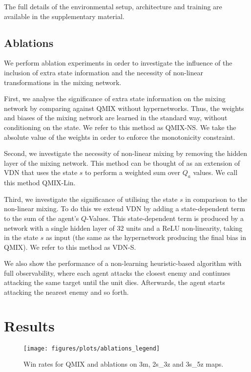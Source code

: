\documentclass{article}
\begin{document}
The full details of the environmental setup, architecture and training are available in the supplementary material.
 





\subsection{Ablations} 
\label{sub:abl}

We perform ablation experiments in order to investigate the influence of the inclusion of extra state information and the necessity of non-linear transformations in the mixing network. 

First, we analyse the significance of extra state information on the mixing network by comparing against QMIX without hypernetworks. Thus, the weights and biases of the mixing network are learned in the standard way, without conditioning on the state. We refer to this method as QMIX-NS. We take the absolute value of the weights in order to enforce the monotonicity constraint.

Second, we investigate the necessity of non-linear mixing by removing the hidden layer of the mixing network. This method can be thought of as an extension of VDN that uses the state $s$ to perform a weighted sum over $Q_a$ values. We call this method QMIX-Lin.

Third, we investigate the significance of utilising the state $s$ in comparison to the non-linear mixing. To do this we extend VDN by adding a state-dependent term to the sum of the agent's $Q$-Values. This state-dependent term is produced by a network with a single hidden layer of $32$ units and a ReLU non-linearity, taking in the state $s$ as input (the same as the hypernetwork producing the final bias in QMIX). We refer to this method as VDN-S.

We also show the performance of a non-learning heuristic-based algorithm with full observability, where each agent attacks the closest enemy and continues attacking the same target until the unit dies. Afterwards, the agent starts attacking the nearest enemy and so forth. 



 \section{Results}
\label{sec:results}

\begin{figure*}[htb!]
    \centering
    \texttt{[image: figures/plots/ablations\_legend]}
    \vfill
    \caption{Win rates for QMIX and ablations on 3m, 2s\_3z and 3s\_5z maps.}
    \label{fig:starcraft_ablations}
\end{figure*}
\end{document}
